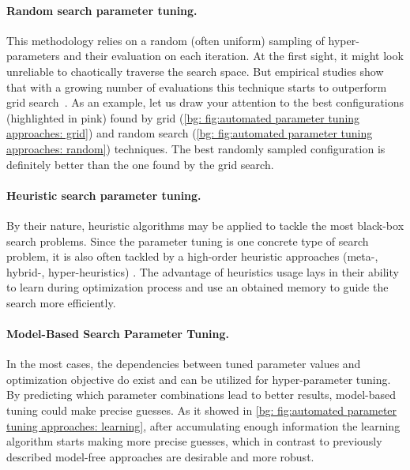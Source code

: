 \paragraph{Random search parameter tuning.} This methodology relies on a random (often uniform) sampling of hyper-parameters and their evaluation on each iteration. At the first sight, it might look unreliable to chaotically traverse the search space. But empirical studies show that with a growing number of evaluations this technique starts to outperform grid search~\cite{bergstra2012random}. As an example, let us draw your attention to the best configurations (highlighted in pink) found by grid (\cref{bg: fig:automated parameter tuning approaches: grid}) and random search (\cref{bg: fig:automated parameter tuning approaches: random}) techniques. The best randomly sampled configuration is definitely better than the one found by the grid search.

\paragraph{Heuristic search parameter tuning.} By their nature, heuristic algorithms may be applied to tackle the most black-box search problems. Since the parameter tuning is one concrete type of search problem, it is also often tackled by a high-order heuristic approaches (meta-, hybrid-, hyper-heuristics) \cite{crawford2013parameter1,crawford2013parameter2,carrizosa2014nested}. The advantage of heuristics usage lays in their ability to learn during optimization process and use an obtained memory to guide the search more efficiently.

\paragraph{Model-Based Search Parameter Tuning.} In the most cases, the dependencies between tuned parameter values and optimization objective do exist and can be utilized for hyper-parameter tuning. By predicting which parameter combinations lead to better results, model-based tuning could make precise guesses. As it showed in \cref{bg: fig:automated parameter tuning approaches: learning}, after accumulating enough information the learning algorithm starts making more precise guesses, which in contrast to previously described model-free approaches are desirable and more robust.

